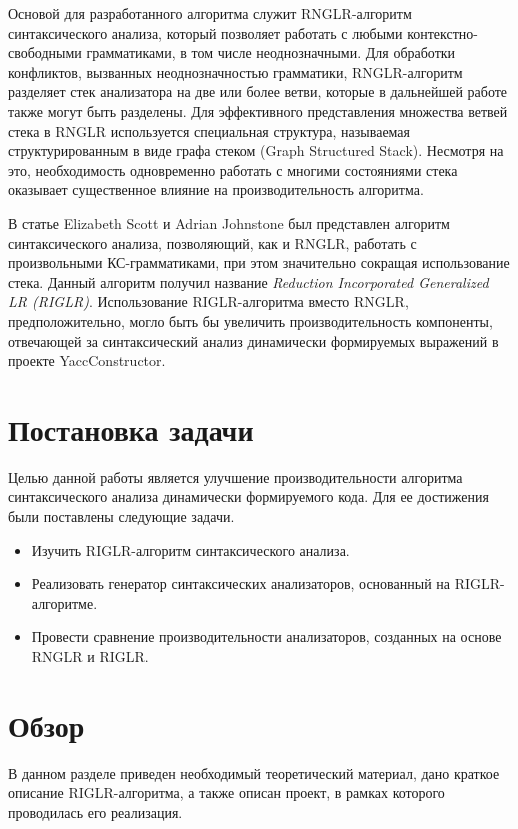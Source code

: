 \documentclass[14pt]{matmex-diploma-custom}
\begin{document}
Основой для разработанного алгоритма служит RNGLR-алгоритм \cite{rnglr} синтаксического анализа, который позволяет работать с любыми контекстно-свободными грамматиками, в том числе неоднозначными. Для обработки конфликтов, вызванных неоднозначностью грамматики, RNGLR-алгоритм разделяет стек анализатора на две или более ветви, которые в дальнейшей работе также могут быть разделены. Для эффективного представления множества ветвей стека в RNGLR используется специальная структура, называемая структурированным в виде графа стеком (Graph Structured Stack). Несмотря на это, необходимость одновременно работать с многими состояниями стека оказывает существенное влияние на производительность алгоритма.

В статье Elizabeth Scott и Adrian Johnstone был представлен алгоритм \cite{riglr} синтаксического анализа, позволяющий, как и RNGLR, работать с произвольными КС-грамматиками, при этом значительно сокращая использование стека. Данный алгоритм получил название \textit{Reduction Incorporated Generalized LR (RIGLR)}. Использование RIGLR-алгоритма вместо RNGLR, предположительно, могло быть бы увеличить производительность компоненты, отвечающей за синтаксический анализ динамически формируемых выражений в проекте YaccConstructor.

\section{Постановка задачи}
Целью данной работы является улучшение производительности алгоритма синтаксического анализа динамически формируемого кода.
Для ее достижения были поставлены следующие задачи. 
\begin{itemize}
    \item Изучить RIGLR-алгоритм синтаксического анализа.
    \item Реализовать генератор синтаксических анализаторов, основанный на RIGLR-алгоритме.
    \item Провести сравнение производительности анализаторов, созданных на основе RNGLR и RIGLR.
\end{itemize}

\section{Обзор}
В данном разделе приведен необходимый теоретический материал, дано краткое описание RIGLR-алгоритма, а также описан проект, в рамках которого проводилась его реализация.
\end{document}
